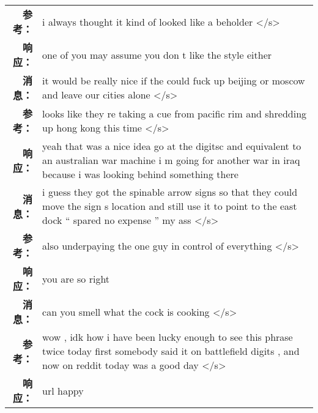 \begin{tabularx}{\textwidth}{@{}rX@{}}
\textbf{参考：}&i always thought it kind of looked like a beholder </s>\\%
\textbf{响应：}&one of you may assume you don t like the style either\\%
\midrule%
\textbf{消息：}&it would be really nice if the could fuck up beijing or moscow and leave our cities alone </s>\\%
\textbf{参考：}&looks like they re taking a cue from pacific rim and shredding up hong kong this time </s>\\%
\textbf{响应：}&yeah that was a nice idea go at the digitsc and equivalent to an australian war machine i m going for another war in iraq because i was looking behind something there\\%
\midrule%
\textbf{消息：}&i guess they got the spinable arrow signs so that they could move the sign s location and still use it to point to the east dock `` spared no expense '' my ass </s>\\%
\textbf{参考：}&also underpaying the one guy in control of everything </s>\\%
\textbf{响应：}&you are so right\\%
\midrule%
\textbf{消息：}&can you smell what the cock is cooking </s>\\%
\textbf{参考：}&wow , idk how i have been lucky enough to see this phrase twice today first somebody said it on battlefield digits , and now on reddit today was a good day </s>\\%
\textbf{响应：}&url happy\\%
\midrule\bottomrule%
%
\end{tabularx}
